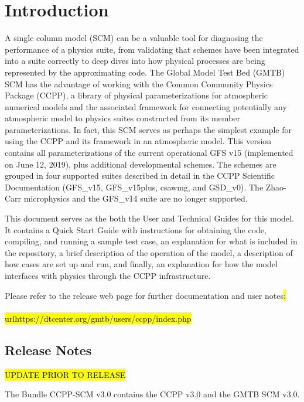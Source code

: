 \chapter{Introduction}
\label{chapter: introduction}

A single column model (SCM) can be a valuable tool for diagnosing the performance of a physics suite, from validating that schemes have been integrated into a suite correctly to deep dives into how physical processes are being represented by the approximating code. The Global Model Test Bed (GMTB) SCM has the advantage of working with the Common Community Physics Package (CCPP), a library of physical parameterizations for atmospheric numerical models and the associated framework for connecting potentially any atmospheric model to physics suites constructed from its member parameterizations. In fact, this SCM serves as perhaps the simplest example for using the CCPP and its framework in an atmospheric model. This version contains all parameterizations of the current operational GFS v15 (implemented on June 12, 2019), plus additional developmental schemes. The schemes are grouped in four supported suites described in detail in the CCPP Scientific Documentation (GFS\_v15, GFS\_v15plus, csawmg, and GSD\_v0). The Zhao-Carr microphysics and the GFS\_v14 suite are no longer supported.

This document serves as the both the User and Technical Guides for this model. It contains a Quick Start Guide with instructions for obtaining the code, compiling, and running a sample test case, an explanation for what is included in the repository, a brief description of the operation of the model, a description of how cases are set up and run, and finally, an explanation for how the model interfaces with physics through the CCPP infrastructure.

Please refer to the release web page for further documentation and user notes\hl{:\\ \\url{https://dtcenter.org/gmtb/users/ccpp/index.php}}

\section{Release Notes}

\hl{UPDATE PRIOR TO RELEASE}

The Bundle CCPP-SCM v3.0 contains the CCPP v3.0 and the GMTB SCM v3.0.

